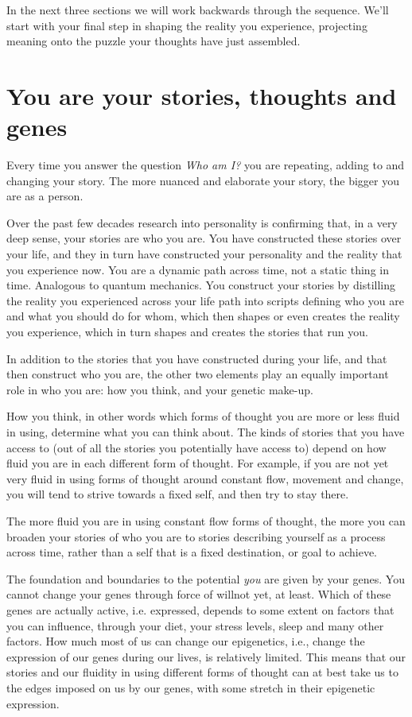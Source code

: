 In the next three sections we will work backwards through the sequence. We'll start with your final step in shaping the reality you experience, projecting meaning onto the puzzle your thoughts have just assembled.


\section{You are your stories, thoughts and genes}
Every time you answer the question \emph{Who am I?} you are repeating, adding to and changing your story. The more nuanced and elaborate your story, the bigger you are as a person. 


Over the past few decades research into personality is confirming that, in a very deep sense, your stories are who you are. You have constructed these stories over your life, and they in turn have constructed your personality and the reality that you experience now. You are a dynamic path across time, not a static thing in time. Analogous to quantum mechanics. You construct your stories by distilling the reality you experienced across your life path into scripts defining who you are and what you should do for whom, which then shapes or even creates the reality you experience, which in turn shapes and creates the stories that run you\cite{BBC-life-story,McLean-stories}.


In addition to the stories that you have constructed during your life, and that then construct who you are, the other two elements play an equally important role in who you are: how you think, and your genetic make-up.


How you think, in other words which forms of thought you are more or less fluid in using, determine what you can think about. The kinds of stories that you have access to (out of all the stories you potentially have access to) depend on how fluid you are in each different form of thought. For example, if you are not yet very fluid in using forms of thought around constant flow, movement and change, you will tend to strive towards a fixed self, and then try to stay there. 


The more fluid you are in using constant flow forms of thought, the more you can broaden your stories of who you are to stories describing yourself as a process across time, rather than a self that is a fixed destination, or goal to achieve.


The foundation and boundaries to the potential \emph{you} are given by your genes. You cannot change your genes through force of will\textemdash not yet, at least. Which of these genes are actually active, i.e. expressed, depends to some extent on factors that you can influence, through your diet, your stress levels, sleep and many other factors. How much most of us can change our epigenetics, i.e., change the expression of our genes during our lives, is relatively limited. This means that our stories and our fluidity in using different forms of thought can at best take us to the edges imposed on us by our genes, with some stretch in their epigenetic expression.


